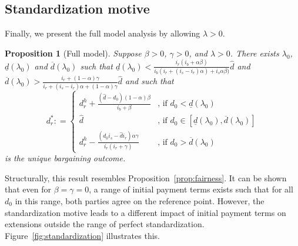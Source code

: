 \documentclass[a4paper,11pt]{article}
\newcommand{\dref}{\widehat d}
\newcommand{\dHyp}{d^h_r}
\renewcommand{\~}[1]{\tilde{#1}}
\renewcommand{\-}[1]{\overline{#1}}
\newtheorem{proposition}{Proposition}
\begin{document}
\subsection{Standardization motive}
Finally, we present the full model analysis by allowing $\lambda>0$.
\begin{proposition}[Full model]\label{prop:full}\singlespacing
    Suppose $\beta>0$, $\gamma>0$, and $\lambda>0$. There exists $\lambda_0$, $\underline{d}\left(\lambda_0\right)$ and $\overline{d}\left(\lambda_0\right)$ such that $\underline{d}\left(\lambda_0\right)<\frac{ i_r (i_b + \alpha \beta)}{
  i_b (i_r + \left(i_s- i_r\right) \alpha) + i_s \alpha \beta)}\dref$ and $\overline{d}\left(\lambda_0\right)>\frac{ i_r + \left(1- \alpha\right) \gamma}{i_r + (i_s-i_r) \alpha + (1-\alpha)\gamma}\dref$ and such that
    \begin{equation}
        d^{*}_r: = \begin{cases}
        \dHyp + \frac{(\dref-d_0) (1 - \alpha) \beta}{i_b + \beta}
  & \text{, if } d_0 < \underline{d}\left(\lambda_0\right)\\
  \dref & \text{, if }d_0\in\left[\underline{d}\left(\lambda_0\right),\overline{d}\left(\lambda_0\right)\right]\\
  \dHyp-\frac{(d_0 i_s-\dref i_r) \alpha \gamma}{i_r (i_r + \gamma)} & \text{, if } d_0 >\overline{d}\left(\lambda_0\right)
        \end{cases}
    \end{equation}
    is the unique bargaining outcome.
\end{proposition}
Structurally, this result resembles Proposition~\ref{prop:fairness}. It can be shown that even for $\beta=\gamma=0$, a range of initial payment terms exists such that for all $d_0$ in this range, both parties agree on the reference point. However, the standardization motive leads to a different impact of initial payment terms on extensions outside the range of perfect standardization. Figure~\ref{fig:standardization} illustrates this. %
\end{document}

